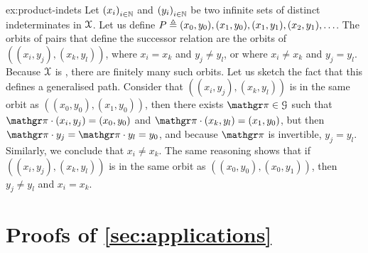 \begin{proofof}{ex:product-indets}
  Let $\seqof{x_i}[i \in \N]$
  and $\seqof{y_i}[i \in \N]$ be two infinite sets of distinct indeterminates
  in $\mathcal{X}$.
  Let us define $P \triangleq (x_0, y_0), (x_1, y_0), (x_1, y_1), (x_2, y_1), \ldots$.
  The orbits of pairs that define the successor relation 
  are the orbits of $((x_i, y_j), (x_k, y_l))$,
  where $x_i = x_k$ and $y_j \neq y_l$, or where $x_i \neq x_k$ and $y_j = y_l$.
  Because $\mathcal{X}$ is , there are finitely many such orbits.
  Let us sketch the fact that this defines a generalised path.
  Consider that
  $((x_i, y_j), (x_k, y_l))$ is in the same orbit as $((x_0, y_0), (x_1, y_0))$,
  then there exists $\gelem \in \group$ such that
  $\gelem \cdot (x_i, y_j) = (x_0, y_0)$ and $\gelem \cdot (x_k, y_l) = (x_1, y_0)$,
  but then $\gelem \cdot y_j = \gelem \cdot y_l = y_0$, and because $\gelem$ is 
  invertible, $y_j = y_l$. Similarly, we conclude that $x_i \neq x_k$.
  The same reasoning shows that if
  $((x_i, y_j), (x_k, y_l))$ is in the same orbit as $((x_0, y_0), (x_0, y_1))$,
  then $y_j \neq y_l$ and $x_i = x_k$.
\end{proofof}



\section{Proofs of \cref{sec:applications}}
\label{sec:applications:proof}

